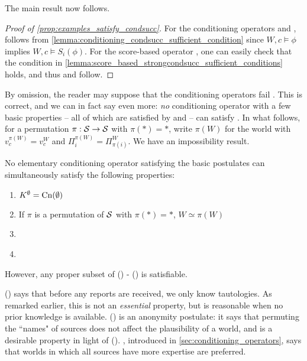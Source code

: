 The main result now follows.

\begin{proof}[Proof of \cref{prop:examples_satisfy_condsucc}]
    For the conditioning operators \varbasedcond{} and \partbasedcond{},
    \condsucc{} follows from
    \cref{lemma:conditioning_condsucc_sufficient_condition} since $W, c \models
    \phi$ implies $W, c \models S_i(\phi)$. For the score-based operator
    \scorebasedop{}, one can easily check that the condition in
    \cref{lemma:score_based_strongcondsucc_sufficient_conditions} holds, and
    thus \strongcondsucc{} and \condsucc{} follow.
\end{proof}

By omission, the reader may suppose that the conditioning operators fail
\strongcondsucc{}. This is correct, and we can in fact say even more: \emph{no}
conditioning operator with a few basic properties -- all of which are satisfied
by \varbasedcond{} and \partbasedcond{} -- can satisfy \strongcondsucc{}.
%
In what follows, for a permutation $\pi: \S \to \S$ with $\pi(\ast) = \ast$,
write $\pi(W)$ for the world with $v^{\pi(W)}_c = v^W_c$ and $\Pi^{\pi(W)}_i =
\Pi^W_{\pi(i)}$. We have an impossibility result.

\begin{proposition}
    \label{prop:strongcondsucc_conditioning_impossibilitity}
    No elementary conditioning operator satisfying the basic postulates can
    simultaneously satisfy the following properties:
    \begin{enumerate}
        \item \label{item:conditioning_impossibility_first}
              $K^\emptyset = \cn(\emptyset)$

        \item \label{item:anonymity}
              If $\pi$ is a permutation of $\S$ with $\pi(\ast) = \ast$, $W
              \simeq \pi(W)$

        \item {}

        \item \label{item:conditioning_impossibility_last} \strongcondsucc{}
    \end{enumerate}
    However, any proper subset of
    () -
    () is satisfiable.
\end{proposition}

() says that before any
reports are received, we only know tautologies. As remarked earlier, this is
not an \emph{essential} property, but is reasonable when no prior knowledge is
available. () is an anonymity postulate: it says that
permuting the ``names" of sources does not affect the plausibility of a world,
and is a desirable property in light of
(). , introduced
in \cref{sec:conditioning_operators}, says that worlds in which all sources
have more expertise are preferred.

